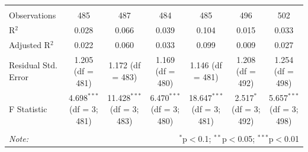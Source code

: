 \documentclass{article}
\begin{document}
\begin{landscape}
\begin{table}[!htbp]
\begin{tabular}{@{\extracolsep{5pt}}lcccccc}
\hline \\[-1.8ex] 
Observations & 485 & 487 & 484 & 485 & 496 & 502 \\ 
R$^{2}$ & 0.028 & 0.066 & 0.039 & 0.104 & 0.015 & 0.033 \\ 
Adjusted R$^{2}$ & 0.022 & 0.060 & 0.033 & 0.099 & 0.009 & 0.027 \\ 
Residual Std. Error & 1.205 (df = 481) & 1.172 (df = 483) & 1.169 (df = 480) & 1.146 (df = 481) & 1.208 (df = 492) & 1.254 (df = 498) \\ 
F Statistic & 4.698$^{***}$ (df = 3; 481) & 11.428$^{***}$ (df = 3; 483) & 6.470$^{***}$ (df = 3; 480) & 18.647$^{***}$ (df = 3; 481) & 2.517$^{*}$ (df = 3; 492) & 5.657$^{***}$ (df = 3; 498) \\ 
\hline 
\hline \\[-1.8ex] 
\textit{Note:}  & \multicolumn{6}{r}{$^{*}$p$<$0.1; $^{**}$p$<$0.05; $^{***}$p$<$0.01} \\ 
\end{tabular} 
\end{table} 
\end{landscape}

\newpage

\end{document}
